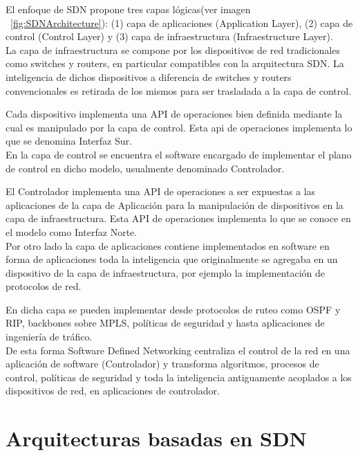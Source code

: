 El enfoque de SDN propone tres capas lógicas(ver imagen ~\ref{fig:SDNArchitecture}): (1) capa de aplicaciones (Application Layer), (2) capa de control (Control Layer) y (3) capa de infraestructura (Infraestructure Layer).\\

La capa de infraestructura se compone por los dispositivos de red tradicionales como switches y routers, en particular compatibles con la arquitectura SDN. La inteligencia de dichos dispositivos a diferencia de switches y routers convencionales es retirada de los mismos para ser trasladada a la capa de control.

Cada dispositivo implementa una API de operaciones bien definida mediante la cual es manipulado por la capa de control. Esta api de operaciones implementa lo que se denomina Interfaz Sur.
\\

En la capa de control se encuentra el software encargado de implementar el plano de control en dicho modelo, usualmente denominado Controlador.

El Controlador implementa una API de operaciones a ser expuestas a las aplicaciones de la capa de Aplicación para la manipulación de dispositivos en la capa de infraestructura. Esta API de operaciones implementa lo que se conoce en el modelo como Interfaz Norte.\\

Por otro lado la capa de aplicaciones contiene implementados en software en forma de aplicaciones toda la inteligencia que originalmente se agregaba en un dispositivo de la capa de infraestructura, por ejemplo la implementaci\'on de protocolos de red.

En dicha capa se pueden implementar desde protocolos de ruteo como OSPF y RIP, backbones sobre MPLS, políticas de seguridad y hasta aplicaciones de ingeniería de tráfico.\\

De esta forma Software Defined Networking centraliza el control de la red en una aplicación de software (Controlador) y transforma algoritmos, procesos de control, políticas de seguridad y toda la inteligencia antiguamente acoplados a los dispositivos de red, en aplicaciones de controlador.\\

\section{Arquitecturas basadas en SDN}
\label{section2.3}

